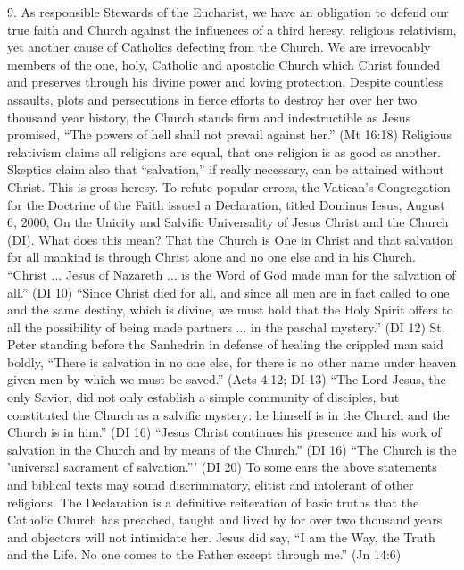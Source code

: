 \documentclass[oneside]{book}
\begin{document}
9. As responsible Stewards of the Eucharist, we have an obligation to defend our
true faith and Church against the influences of a third heresy, religious
relativism, yet another cause of Catholics defecting from the Church. We are
irrevocably members of the one, holy, Catholic and apostolic Church which Christ
founded and preserves through his divine power and loving protection. Despite
countless assaults, plots and persecutions in fierce efforts to destroy her over
her two thousand year history, the Church stands firm and indestructible as
Jesus promised, ``The powers of hell shall not prevail against her.'' (Mt 16:18)
Religious relativism claims all religions are equal, that one religion is as
good as another. Skeptics claim also that ``salvation,'' if really necessary,
can be attained without Christ. This is gross heresy. To refute popular errors,
the Vatican's Congregation for the Doctrine of the Faith issued a Declaration,
titled Dominus Iesus, August 6, 2000, On the Unicity and Salvific Universality
of Jesus Christ and the Church (DI).
What does this mean? That the Church is One in Christ and that salvation for all
mankind is through Christ alone and no one else and in his Church. ``Christ
... Jesus of Nazareth ... is the Word of God made man for the salvation of
all.'' (DI 10) ``Since Christ died for all, and since all men are in fact called
to one and the same destiny, which is divine, we must hold that the Holy Spirit
offers to all the possibility of being made partners ... in the paschal
mystery.'' (DI 12) St. Peter standing before the Sanhedrin in defense of healing
the crippled man said boldly, ``There is salvation in no one else, for there is
no other name under heaven given men by which we must be saved.'' (Acts 4:12; DI
13) ``The Lord Jesus, the only Savior, did not only establish a simple community
of disciples, but constituted the Church as a salvific mystery: he himself is in
the Church and the Church is in him.'' (DI 16) ``Jesus Christ continues his
presence and his work of salvation in the Church and by means of the Church.''
(DI 16) ``The Church is the 'universal sacrament of salvation.''' (DI 20)
To some ears the above statements and biblical texts may sound discriminatory,
elitist and intolerant of other religions. The Declaration is a definitive
reiteration of basic truths that the Catholic Church has preached, taught and
lived by for over two thousand years and objectors will not intimidate
her. Jesus did say, ``I am the Way, the Truth and the Life. No one comes to the
Father except through me.'' (Jn 14:6)
\end{document}
